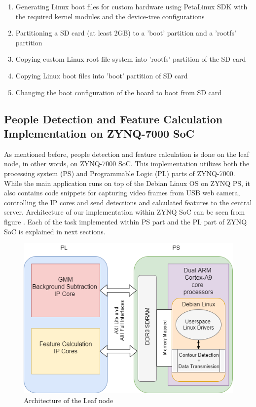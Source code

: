 \documentclass[12pt,a4paper]{report}
\begin{document}
\begin{enumerate}
\item Generating Linux boot files for custom hardware using PetaLinux SDK with the required kernel modules and the device-tree configurations
\item Partitioning a SD card (at least 2GB) to a 'boot' partition and a 'rootfs' partition
\item Copying custom Linux root file system into 'rootfs' partition of the SD card
\item Copying Linux boot files into 'boot' partition of SD card
\item Changing the boot configuration of the board to boot from SD card
\end{enumerate}

\subsection{People Detection and Feature Calculation Implementation on ZYNQ-7000 SoC}
As mentioned before, people detection and feature calculation is done on the leaf node, in other words, on ZYNQ-7000 SoC. This implementation utilizes both the processing system (PS) and Programmable Logic (PL) parts of ZYNQ-7000. While the main application runs on top of the Debian Linux OS on ZYNQ PS, it also contains code snippets for capturing video frames from USB web camera, controlling the IP cores and send detections and calculated features to the central server. Architecture of our implementation within ZYNQ SoC can be seen from figure . Each of the task implemented within PS part and the PL part of ZYNQ SoC is explained in next sections.

\begin{figure}[H]
\includegraphics[width=\textwidth]{hardware.png}
\centering
\caption{Architecture of the Leaf node}
\label{leafnode_Archi}
\end{figure}
\end{document}

